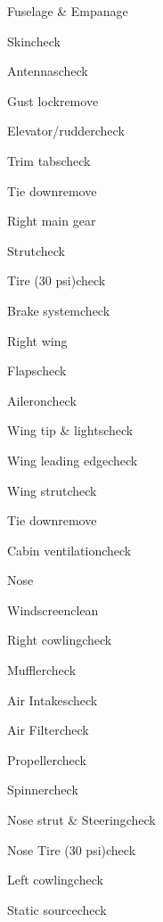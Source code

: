 \begin{multicols}{2}
\begin{checklist}{Fuselage \& Empanage}
  \item{Skin}{check}
  \item{Antennas}{check}
  \item{Gust lock}{remove}
  \item{Elevator/rudder}{check}
  \item{Trim tabs}{check}
  \item{Tie down}{remove}
\end{checklist}

\begin{checklist}{Right main gear}
  \item{Strut}{check}
  \item{Tire (30 psi)}{check}
  \item{Brake system}{check}
\end{checklist}

\begin{checklist}{Right wing}
  \item{Flaps}{check}
  \item{Aileron}{check}
  \item{Wing tip \& lights}{check}
  \item{Wing leading edge}{check}
  \item{Wing strut}{check}
  \item{Tie down}{remove}
  \item{Cabin ventilation}{check}
\end{checklist}

\begin{checklist}{Nose}
  \item{Windscreen}{clean}
  \item{Right cowling}{check}
  \item{Muffler}{check}
  \item{Air Intakes}{check}
  \item{Air Filter}{check}
  \item{Propeller}{check}
  \item{Spinner}{check}
  \item{Nose strut \& Steering}{check}
  \item{Nose Tire (30 psi)}{check}
  \item{Left cowling}{check}
  \item{Static source}{check}
\end{checklist}
\end{multicols}
